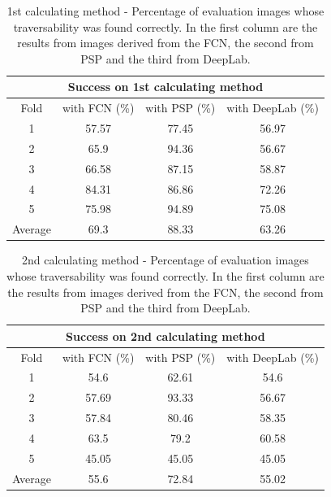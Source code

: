 \documentclass[12pt,a4paper,table,dvipsnames,tikz]{report}
\newcommand{\acronym}{\MakeUppercase}
\begin{document}
	\begin{table}[h!]
		\centering
		\begin{tabular}{|c|c|c|c|}
			\hline
			\multicolumn{4}{|c|}{Success on 1st calculating method}\\
			\hline
			Fold & with \acronym{fcn} (\%) & with \acronym{psp} (\%) & with DeepLab (\%)\\ 
			\hline\hline
			1 & 57.57 & 77.45 & 56.97\\
			\hline
			2 & 65.9 & 94.36 & 56.67\\
			\hline
			3 & 66.58 & 87.15 & 58.87\\
			\hline
			4 & 84.31 & 86.86 & 72.26\\
			\hline
			5 & 75.98 & 94.89 & 75.08\\
			\hline\hline
			Average & 69.3 & 88.33 & 63.26\\
			\hline
		\end{tabular}
		\caption{1st calculating method - Percentage of evaluation images whose 
		traversability was found correctly. In the first column are the results from 
		images derived from the \acronym{fcn}, the second from \acronym{psp} and the 
		third from DeepLab.}
		\label{table:1st}
	\end{table}
	
	\begin{table}[h!]
		\centering
		\begin{tabular}{|c|c|c|c|}
			\hline
			\multicolumn{4}{|c|}{Success on 2nd calculating method}\\
			\hline
			Fold & with \acronym{fcn} (\%) & with \acronym{psp} (\%) & with DeepLab (\%)\\ 
			\hline\hline
			1 & 54.6 & 62.61 & 54.6\\
			\hline
			2 & 57.69 & 93.33 & 56.67\\
			\hline
			3 & 57.84 & 80.46 & 58.35\\
			\hline
			4 & 63.5 & 79.2 & 60.58\\
			\hline
			5 & 45.05 & 45.05 & 45.05\\
			\hline\hline
			Average & 55.6 & 72.84 & 55.02\\
			\hline
		\end{tabular}
		\caption{2nd calculating method - Percentage of evaluation images whose 
		traversability was found correctly. In the first column are the results from 
		images derived from the \acronym{fcn}, the second from \acronym{psp} and the 
		third from DeepLab.}
		\label{table:2nd}
	\end{table}
	
\end{document}
